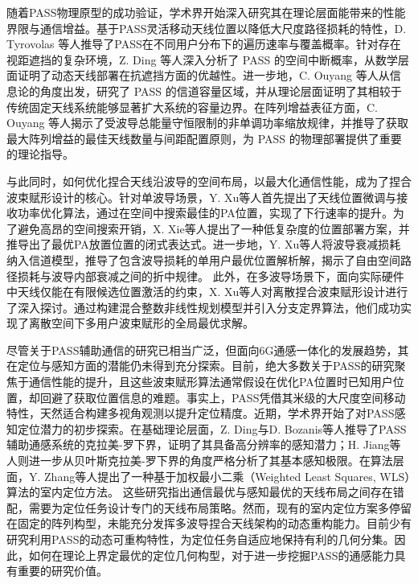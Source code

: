 随着PASS物理原型的成功验证，学术界开始深入研究其在理论层面能带来的性能界限与通信增益\cite{hou2026performance,hou2026performancea}。基于PASS灵活移动天线位置以降低大尺度路径损耗的特性，D. Tyrovolas 等人推导了PASS在不同用户分布下的遍历速率与覆盖概率\cite{tyrovolas2026performance}。针对存在视距遮挡的复杂环境，Z. Ding 等人深入分析了 PASS 的空间中断概率，从数学层面证明了动态天线部署在抗遮挡方面的优越性\cite{ding2025blockage}。进一步地，C. Ouyang 等人从信息论的角度出发，研究了 PASS 的信道容量区域，并从理论层面证明了其相较于传统固定天线系统能够显著扩大系统的容量边界\cite{ouyang2026capacity}。在阵列增益表征方面，C. Ouyang 等人揭示了受波导总能量守恒限制的非单调功率缩放规律，并推导了获取最大阵列增益的最佳天线数量与间距配置原则，为 PASS 的物理部署提供了重要的理论指导\cite{ouyang2025array}。

与此同时，如何优化捏合天线沿波导的空间布局，以最大化通信性能，成为了捏合波束赋形设计的核心\cite{wang2025modeling}。针对单波导场景，Y. Xu等人首先提出了天线位置微调与接收功率优化算法，通过在空间中搜索最佳的PA位置，实现了下行速率的提升\cite{xu2025rate}。为了避免高昂的空间搜索开销，X. Xie等人提出了一种低复杂度的位置部署方案，并推导出了最优PA放置位置的闭式表达式\cite{xie2025lowcomplexity}。进一步地，Y. Xu等人将波导衰减损耗纳入信道模型，推导了包含波导损耗的单用户最优位置解析解，揭示了自由空间路径损耗与波导内部衰减之间的折中规律\cite{xu2026pinchingantenna}。
此外，在多波导场景下，面向实际硬件中天线仅能在有限候选位置激活的约束，X. Xu等人对离散捏合波束赋形设计进行了深入探讨。通过构建混合整数非线性规划模型并引入分支定界算法，他们成功实现了离散空间下多用户波束赋形的全局最优求解\cite{xu2026pinching}。

尽管关于PASS辅助通信的研究已相当广泛，但面向6G通感一体化的发展趋势，其在定位与感知方面的潜能仍未得到充分探索。目前，绝大多数关于PASS的研究聚焦于通信性能的提升，且这些波束赋形算法通常假设在优化PA位置时已知用户位置，却回避了获取位置信息的难题。事实上，PASS凭借其米级的大尺度空间移动特性，天然适合构建多视角观测以提升定位精度。近期，学术界开始了对PASS感知定位潜力的初步探索。在基础理论层面，Z. Ding与D. Bozanis等人推导了PASS辅助通感系统的克拉美-罗下界，证明了其具备高分辨率的感知潜力\cite{ding2025pinchingantenna,bozanis2025cramer}；H. Jiang等人则进一步从贝叶斯克拉美-罗下界的角度严格分析了其基本感知极限\cite{jiang2025pinching}。在算法层面，Y. Zhang等人提出了一种基于加权最小二乘（Weighted Least Squares, WLS）算法的室内定位方法\cite{zhang2025pinchingantenna}。
这些研究指出通信最优与感知最优的天线布局之间存在错配，需要为定位任务设计专门的天线布局策略。然而，现有的室内定位方案多停留在固定的阵列构型，未能充分发挥多波导捏合天线架构的动态重构能力。目前少有研究利用PASS的动态可重构特性，为定位任务自适应地保持有利的几何分集。因此，如何在理论上界定最优的定位几何构型，对于进一步挖掘PASS的通感能力具有重要的研究价值。


